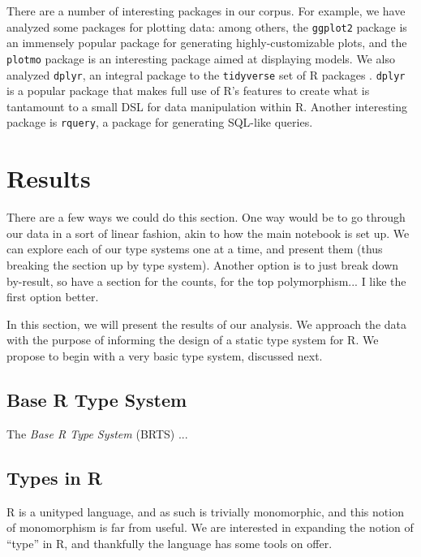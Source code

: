 \documentclass[acmsmall,10pt,review,anonymous]{acmart}\settopmatter{printfolios=true,printccs=false,printacmref=false}
\begin{document}
There are a number of interesting packages in our corpus.    For example, we have analyzed some packages for
plotting data: among others, the {\tt ggplot2} package is an immensely
popular package for generating highly-customizable plots, and the {\tt
  plotmo} package is an interesting package aimed at displaying models.  We
also analyzed {\tt dplyr}, an integral package to the {\tt tidyverse} set of
R packages .  {\tt dplyr} is a
popular package that makes full use of R's features to create what is
tantamount to a small DSL for data manipulation within R.  Another
interesting package is {\tt rquery}, a package for generating SQL-like
queries.


%
%
%
%
%
%
\section{Results}

 There are a few ways we could do this section.
One way would be to go through our data in a sort of linear fashion, akin to how the main notebook is set up.
We can explore each of our type systems one at a time, and present them (thus breaking the section up by type system).
Another option is to just break down by-result, so have a section for the counts, for the top polymorphism...
I like the first option better.

In this section, we will present the results of our analysis. 
We approach the data with the purpose of informing the design of a static type system for R.
We propose to begin with a very basic type system, discussed next.

\subsection{Base R Type System}

The {\it Base R Type System} (BRTS) ...

%
%
%
%
\subsection{Types in R}


R is a unityped language, and as such is trivially monomorphic, and this notion of monomorphism is far from useful.
We are interested in expanding the notion of ``type'' in R, and thankfully the language has some tools on offer.
\end{document}
